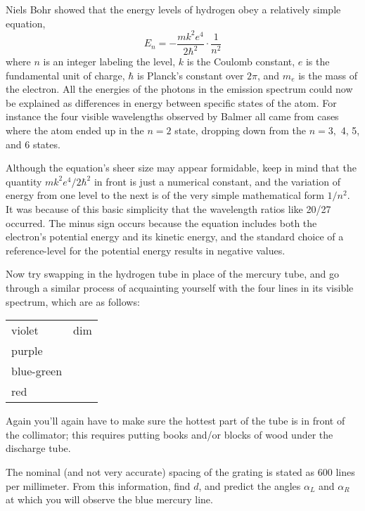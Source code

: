 Niels Bohr showed that the energy levels of hydrogen obey a relatively simple equation,\label{bohr-equation}
\begin{equation*}
	E_n = -\frac{mk^2e^4}{2\hbar^2}\cdot\frac{1}{n^2}
\end{equation*}
where $n$ is an integer labeling the level, $k$ is the
Coulomb constant, $e$ is the fundamental unit of charge, $\hbar$
is Planck's constant over $2\pi$, and $m_e$ is the mass of the electron.
All the energies of the photons in the emission spectrum
could now be explained as differences in energy between
specific states of the atom. For instance the four visible
wavelengths observed by Balmer all came from cases where the
atom ended up in the $n=2$ state, dropping down from the
$n=3,$ 4, 5, and 6 states.

Although the equation's sheer size may appear for\-mid\-ab\-le,
keep in mind that the quantity $mk^2e^4/2\hbar^2$ in front is just a
numerical constant, and the variation of energy from one
level to the next is of the very simple mathematical form
$1/n^2$. It was because of this basic simplicity that the
wavelength ratios like 20/27 occurred. The minus sign occurs
because the equation includes both the electron's potential
energy and its kinetic energy, and the standard choice of a
reference-level for the potential energy results in negative values. 

Now try swapping in the hydrogen tube in place of the mercury tube, and go through
a similar process of acquainting yourself with the four lines in its visible spectrum, which are as
follows:

\begin{tabular}{lp{50mm}}
  violet & dim \\
  purple & \\
  blue-green & \\
  red
\end{tabular}

Again you'll again have to make
sure the hottest part of the tube is in front of the
collimator; this requires putting
books and/or blocks of wood under the discharge tube.

\prelabquestion  
The nominal (and not very accurate) spacing of the grating is stated
as 600 lines per millimeter. From this information, find $d$, and
predict the angles $\alpha_L$ and $\alpha_R$ at which you will observe the blue mercury line.


